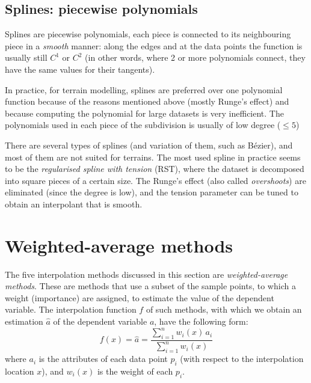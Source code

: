 %
\subsection{Splines: piecewise polynomials}%

Splines are piecewise polynomials, each piece is connected to its neighbouring piece in a \emph{smooth} manner: along the edges and at the data points the function is usually still $C^1$ or $C^2$ (in other words, where 2 or more polynomials connect, they have the same values for their tangents).

In practice, for terrain modelling, splines are preferred over one polynomial function because of the reasons mentioned above (mostly Runge's effect) and because computing the polynomial for large datasets is very inefficient.
The polynomials used in each piece of the subdivision is usually of low degree ($\leq 5$)

%

There are several types of splines (and variation of them, such as Bézier), and most of them are not suited for terrains.
The most used spline in practice seems to be the \emph{regularised spline with tension} (RST), where the dataset is decomposed into square pieces of a certain size.
The Runge's effect (also called \emph{overshoots}) are eliminated (since the degree is low), and the tension parameter can be tuned to obtain an interpolant that is smooth.




\section{Weighted-average methods}%
\label{sec:wam_interpol}


The five interpolation methods discussed in this section are \emph{weighted-average methods}.
These are methods that use a subset of the sample points, to which a weight (importance) are assigned, to estimate the value of the dependent variable. 
The interpolation function $f$ of such methods, with which we obtain an estimation $\hat{a}$ of the dependent variable $a$, have the following form:
\begin{equation}
  f(x) = \hat{a} = \frac{\sum_{i=1}^n w_{i}(x) \, a_{i}}{\sum_{i=1}^{n} w_{i}(x)}
  \label{eq:wai}
\end{equation}
where $a_i$ is the attributes of each data point $p_i$ (with respect to the interpolation location $x$), and $w_{i}(x)$ is the weight of each $p_i$. 

